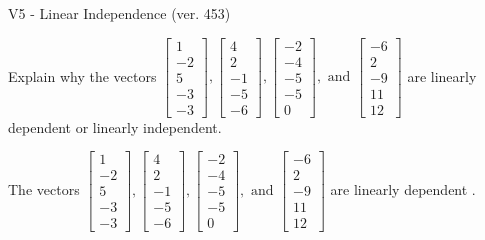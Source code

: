 \begin{exercise}
  \begin{exerciseTitle}V5 - Linear Independence (ver. 453)\end{exerciseTitle}
  \begin{exerciseStatement}
    Explain why the vectors \(\left[\begin{array}{r}
1 \\
-2 \\
5 \\
-3 \\
-3
\end{array}\right] , \left[\begin{array}{r}
4 \\
2 \\
-1 \\
-5 \\
-6
\end{array}\right] , \left[\begin{array}{r}
-2 \\
-4 \\
-5 \\
-5 \\
0
\end{array}\right] , \text{ and } \left[\begin{array}{r}
-6 \\
2 \\
-9 \\
11 \\
12
\end{array}\right]\) are linearly dependent or linearly independent.	


  \end{exerciseStatement}
  \begin{exerciseAnswer}
   The vectors \(\left[\begin{array}{r}
1 \\
-2 \\
5 \\
-3 \\
-3
\end{array}\right] , \left[\begin{array}{r}
4 \\
2 \\
-1 \\
-5 \\
-6
\end{array}\right] , \left[\begin{array}{r}
-2 \\
-4 \\
-5 \\
-5 \\
0
\end{array}\right] , \text{ and } \left[\begin{array}{r}
-6 \\
2 \\
-9 \\
11 \\
12
\end{array}\right]\) are 
  	 linearly dependent  .
  


  \end{exerciseAnswer}
\end{exercise}